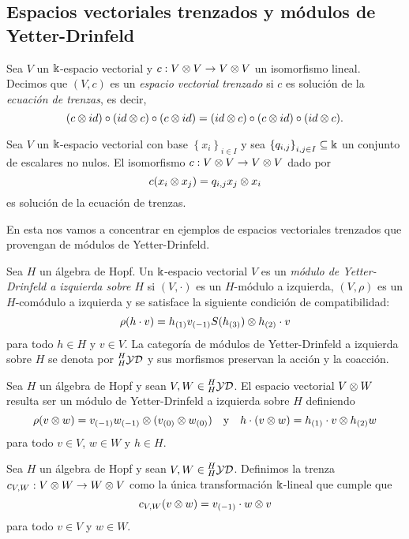 \documentclass[a4paper,oneside,fleqn,11pt,../tesis.tex]{subfiles}
\newcommand{\yetter}{\prescript{H}{H}{\mathcal{YD}}}
\begin{document}
\subsection{Espacios vectoriales trenzados y módulos de Yetter-Drinfeld}

\begin{definition}
	Sea $V$ un $\Bbbk$-espacio vectorial y $c:V \otimes V \to V \otimes V$ un isomorfismo lineal. Decimos
	que $(V,c)$ es un \emph{espacio vectorial trenzado} si $c$ es solución de la \emph{ecuación de trenzas}, es decir,
	\[
		(c \otimes id)\circ(id \otimes c)\circ(c \otimes id) = (id \otimes c)\circ(c \otimes id)\circ(id \otimes c).
	\] 
\end{definition}

\begin{example}
	Sea $V$ un $\Bbbk$-espacio vectorial con base $\left\lbrace x_i \right\rbrace_{i \in I}$
	y sea $\left\lbrace q_{i, j} \right\rbrace_{i, j \in I} \subseteq \Bbbk$ un conjunto de escalares no nulos.
	El isomorfismo $c:V \otimes V \to V \otimes V$ dado por
	\[
		c(x_i \otimes x_j) = q_{i, j} x_j \otimes x_i
	\] es solución de la ecuación de trenzas.
\end{example}

En esta  nos vamos a concentrar en ejemplos de espacios vectoriales trenzados que provengan de módulos
de Yetter-Drinfeld.

\begin{definition}
	Sea $H$ un álgebra de Hopf. Un $\Bbbk$-espacio vectorial $V$ es un \emph{módulo de Yetter-Drinfeld a izquierda sobre $H$}
	si $\left(V, \cdot\right)$ es un $H$-módulo a izquierda, $(V, \rho)$ es un $H$-comódulo a izquierda
	y se satisface la siguiente condición de compatibilidad:
	\[
		\rho(h \cdot v) = h_{(1)}v_{(-1)}S(h_{(3)}) \otimes h_{(2)} \cdot v	
	\]
	para todo $h \in H$ y $v \in V$. La categoría de módulos de Yetter-Drinfeld a izquierda sobre $H$ se denota por $\yetter$ y
	sus morfismos preservan la acción y la coacción.
\end{definition}

Sea $H$ un álgebra de Hopf y sean $V, W \in \yetter$. El espacio vectorial $V \otimes W$ resulta ser un módulo de Yetter-Drinfeld
a izquierda sobre $H$ definiendo
\[
	\rho(v \otimes w) = v_{(-1)}w_{(-1)} \otimes (v_{(0)} \otimes w_{(0)}) \quad\text{y}\quad h\cdot (v \otimes w) = h_{(1)}\cdot v \otimes h_{(2)} w
\]
para todo $v \in V$, $w \in W$ y $h \in H$.

\begin{definition}
	Sea $H$ un álgebra de Hopf y sean $V, W \in \yetter$. Definimos la trenza $c_{V, W}: V\otimes W \to W\otimes V$ como la única
	transformación $\Bbbk$-lineal que cumple que
	\[
		c_{V, W}(v \otimes w) = v_{(-1)} \cdot w \otimes v	
	\]
	para todo $v \in V$ y $w \in W$.
\end{definition}
\end{document}
